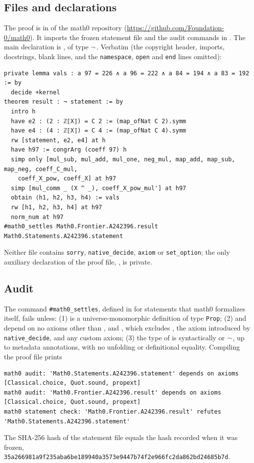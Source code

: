 \documentclass[11pt]{amsart}
\theoremstyle{plain}
\theoremstyle{definition}
\begin{document}
\subsection*{Files and declarations}
The proof is in  of the math0 repository (\url{https://github.com/Foundation-0/math0}). It imports the frozen statement file  and the audit commands in . The main declaration is , of type $\neg$\,. Verbatim (the copyright header, imports, docstrings, blank lines, and the \texttt{namespace}, \texttt{open} and \texttt{end} lines omitted):
\begin{lstlisting}
private lemma vals : a 97 = 226 ∧ a 96 = 222 ∧ a 84 = 194 ∧ a 83 = 192 := by
  decide +kernel
theorem result : ¬ statement := by
  intro h
  have e2 : (2 : ℤ⟦X⟧) = C 2 := (map_ofNat C 2).symm
  have e4 : (4 : ℤ⟦X⟧) = C 4 := (map_ofNat C 4).symm
  rw [statement, e2, e4] at h
  have h97 := congrArg (coeff 97) h
  simp only [mul_sub, mul_add, mul_one, neg_mul, map_add, map_sub, map_neg, coeff_C_mul,
    coeff_X_pow, coeff_X] at h97
  simp [mul_comm _ (X ^ _), coeff_X_pow_mul'] at h97
  obtain ⟨h1, h2, h3, h4⟩ := vals
  rw [h1, h2, h3, h4] at h97
  norm_num at h97
#math0_settles Math0.Frontier.A242396.result Math0.Statements.A242396.statement
\end{lstlisting}
Neither file contains \texttt{sorry}, \texttt{native\_decide}, \texttt{axiom} or \texttt{set\_option}; the only auxiliary declaration of the proof file, , is private.

\subsection*{Audit}
The command \texttt{\#math0\_settles}, defined in  for statements that math0 formalizes itself, fails unless: (1)  is a universe-monomorphic definition of type \texttt{Prop}; (2)  and  depend on no axioms other than ,  and , which excludes , the axiom  introduced by \texttt{native\_decide}, and any custom axiom; (3) the type of  is syntactically  or $\neg$\,, up to metadata annotations, with no unfolding or definitional equality. Compiling the proof file prints
\begin{lstlisting}[basicstyle=\ttfamily\scriptsize]
math0 audit: 'Math0.Statements.A242396.statement' depends on axioms [Classical.choice, Quot.sound, propext]
math0 audit: 'Math0.Frontier.A242396.result' depends on axioms [Classical.choice, Quot.sound, propext]
math0 statement check: 'Math0.Frontier.A242396.result' refutes 'Math0.Statements.A242396.statement'
\end{lstlisting}
The SHA-256 hash of the statement file equals the hash recorded when it was frozen, \texttt{35a266981a9f235aba6be189940a3573e9447b74f2e966fc2da862bd24685b7d}.
\end{document}
